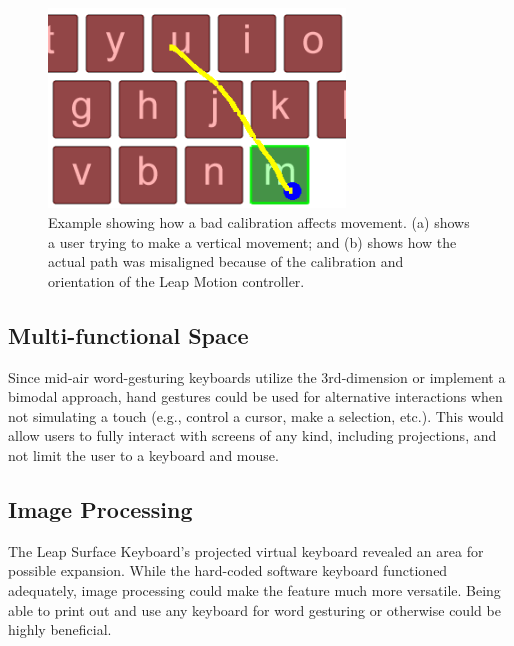 \begin{figure}[!t]
\begin{minipage}[t]{5in}
\begin{minipage}[t]{3.5in}
			\begin{minipage}[t]{0.4in}
			\end{minipage}
			\begin{minipage}[t]{3.1in}
				\includegraphics[width=3.1in]{Figures/fig_actual_path}
			\end{minipage}
		\end{minipage}
	\end{minipage}
	\caption[Bad Calibration Example]{Example showing how a bad calibration affects movement. (a) shows a user trying to make a vertical movement; and (b) shows how the actual path was misaligned because of the calibration and orientation of the Leap Motion controller.}
	\label{bad_calib_problem}
\end{figure}

\subsection{Multi-functional Space}
Since mid-air word-gesturing keyboards utilize the 3rd-dimension or implement a bimodal approach, hand gestures could be used for alternative interactions when not simulating a touch (e.g., control a cursor, make a selection, etc.). This would allow users to fully interact with screens of any kind, including projections, and not limit the user to a keyboard and mouse.

\subsection{Image Processing}
The Leap Surface Keyboard's projected virtual keyboard revealed an area for possible expansion. While the hard-coded software keyboard functioned adequately, image processing could make the feature much more versatile. Being able to print out and use any keyboard for word gesturing or otherwise could be highly beneficial.

